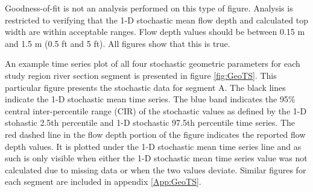 \begin{linenumbers}
Goodness-of-fit is not an analysis performed on this type of figure.  Analysis is restricted to verifying that the 1-D stochastic mean flow depth and calculated top width are within acceptable ranges.  Flow depth values should be between 0.15 m and 1.5 m (0.5 ft and 5 ft).  All figures show that this is true.

An example time series plot of all four stochastic geometric parameters for each study region river section segment is presented in figure \ref{fig:GeoTS}.  This particular figure presents the stochastic data for segment A.  The black lines indicate the 1-D stochastic mean time series.  The blue band indicates the 95\% central inter-percentile range (CIR) of the stochastic values as defined by the 1-D stohastic 2.5th percentile and 1-D stochastic 97.5th percentile time series.  The red dashed line in the flow depth portion of the figure indicates the reported flow depth values.  It is plotted under the 1-D stochastic mean time series line and as such is only visible when either the 1-D stochastic mean time series value was not calculated due to missing data or when the two values deviate.  Similar figures for each segment are included in appendix \ref{App:GeoTS}.


\end{linenumbers}
